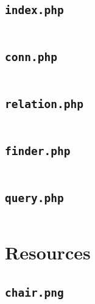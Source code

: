 \documentclass[american,extrafontsizes,12pt,portrait,letterpaper,oneside,onecolumn,final]{memoir}
\begin{document}
\subsection{\texorpdfstring{\texttt{index.php}}{\texttt{index.php}}}

\inputminted[linenos,breaklines,breakanywhere]{html+php}{index.php}

\subsection{\texorpdfstring{\texttt{conn.php}}{\texttt{conn.php}}}

\inputminted[linenos,breaklines,breakanywhere]{html+php}{conn.php}

\subsection{\texorpdfstring{\texttt{relation.php}}{\texttt{relation.php}}}

\inputminted[linenos,breaklines,breakanywhere]{html+php}{relation.php}

\subsection{\texorpdfstring{\texttt{finder.php}}{\texttt{finder.php}}}

\inputminted[linenos,breaklines,breakanywhere]{html+php}{finder.php}

\subsection{\texorpdfstring{\texttt{query.php}}{\texttt{query.php}}}

\inputminted[linenos,breaklines,breakanywhere]{html+php}{query.php}

\section{Resources}

\subsection{\texorpdfstring{\texttt{chair.png}}{\texttt{chair.png}}}
\end{document}

